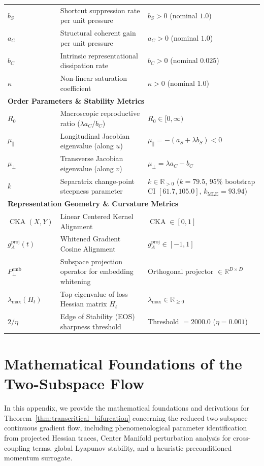 \documentclass{article}
\theoremstyle{plain}
\theoremstyle{definition}
\DeclareMathOperator{\CKA}{CKA}
\begin{document}
\begin{table}[h]
\begin{small}
\begin{tabular}{lll}
$b_S$ & Shortcut suppression rate per unit pressure & $b_S > 0$ (nominal $1.0$) \\
$a_C$ & Structural coherent gain per unit pressure & $a_C > 0$ (nominal $1.0$) \\
$b_C$ & Intrinsic representational dissipation rate & $b_C > 0$ (nominal $0.025$) \\
$\kappa$ & Non-linear saturation coefficient & $\kappa > 0$ (nominal $1.0$) \\
\midrule
\multicolumn{3}{l}{\textbf{Order Parameters \& Stability Metrics}} \\
$R_0$ & Macroscopic reproductive ratio ($\lambda a_C / b_C$) & $R_0 \in [0, \infty)$ \\
$\mu_{\parallel}$ & Longitudinal Jacobian eigenvalue (along $u$) & $\mu_{\parallel} = -(a_S + \lambda b_S) < 0$ \\
$\mu_{\perp}$ & Transverse Jacobian eigenvalue (along $v$) & $\mu_{\perp} = \lambda a_C - b_C$ \\
$k$ & Separatrix change-point steepness parameter & $k \in \mathbb{R}_{> 0}$ ($k = 79.5$, $95\%$ bootstrap CI $[61.7, 105.0]$, $k_{\text{MLE}} = 93.94$) \\
\multicolumn{3}{l}{\textbf{Representation Geometry \& Curvature Metrics}} \\
$\CKA(X, Y)$ & Linear Centered Kernel Alignment & $\CKA \in [0, 1]$ \\
$g_A^{\text{proj}}(t)$ & Whitened Gradient Cosine Alignment & $g_A^{\text{proj}} \in [-1, 1]$ \\
$P_{\perp}^{\text{emb}}$ & Subspace projection operator for embedding whitening & Orthogonal projector $\in \mathbb{R}^{D \times D}$ \\
$\lambda_{\text{max}}(H_t)$ & Top eigenvalue of loss Hessian matrix $H_t$ & $\lambda_{\text{max}} \in \mathbb{R}_{\ge 0}$ \\
$2/\eta$ & Edge of Stability (EOS) sharpness threshold & $\text{Threshold } = 2000.0$ ($\eta = 0.001$) \\
\bottomrule
\end{tabular}
\end{small}
\end{table}

\section{Mathematical Foundations of the Two-Subspace Flow}
\label{sec:appendix_proof}

In this appendix, we provide the mathematical foundations and derivations for Theorem~\ref{thm:transcritical_bifurcation} concerning the reduced two-subspace continuous gradient flow, including phenomenological parameter identification from projected Hessian traces, Center Manifold perturbation analysis for cross-coupling terms, global Lyapunov stability, and a heuristic preconditioned momentum surrogate.
\end{document}
